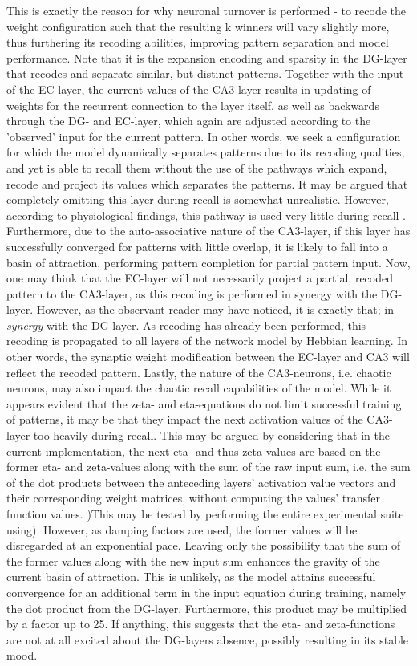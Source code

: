 This is exactly the reason for why neuronal turnover is performed - to recode the weight configuration such that the resulting k winners will vary slightly more, thus furthering its recoding abilities, improving pattern separation and model performance. Note that it is the expansion encoding and sparsity in the DG-layer that recodes and separate similar, but distinct patterns. Together with the input of the EC-layer, the current values of the CA3-layer results in updating of weights for the recurrent connection to the layer itself, as well as backwards through the DG- and EC-layer, which again are adjusted according to the 'observed' input for the current pattern. In other words, we seek a configuration for which the model dynamically separates patterns due to its recoding qualities, and yet is able to recall them without the use of the pathways which expand, recode and project its values which separates the patterns. It may be argued that completely omitting this layer during recall is somewhat unrealistic. However, according to physiological findings, this pathway is used very little during recall \citep{Wakagi2008}. Furthermore, due to the auto-associative nature of the CA3-layer, if this layer has successfully converged for patterns with little overlap, it is likely to fall into a basin of attraction, performing pattern completion for partial pattern input. Now, one may think that the EC-layer will not necessarily project a partial, recoded pattern to the CA3-layer, as this recoding is performed in synergy with the DG-layer. However, as the observant reader may have noticed, it is exactly that; in \textit{synergy} with the DG-layer. As recoding has already been performed, this recoding is propagated to all layers of the network model by Hebbian learning. In other words, the synaptic weight modification between the EC-layer and CA3 will reflect the recoded pattern.
Lastly, the nature of the CA3-neurons, i.e. chaotic neurons, may also impact the chaotic recall capabilities of the model. While it appears evident that the zeta- and eta-equations do not limit successful training of patterns, it may be that they impact the next activation values of the CA3-layer too heavily during recall. This may be argued by considering that in the current implementation, the next eta- and thus zeta-values are based on the former eta- and zeta-values along with the sum of the raw input sum, i.e. the sum of the dot products between the anteceding layers' activation value vectors and their corresponding weight matrices, without computing the values' transfer function values. )This may be tested by performing the entire experimental suite using). However, as damping factors are used, the former values will be disregarded at an exponential pace. Leaving only the possibility that the sum of the former values along with the new input sum enhances the gravity of the current basin of attraction. This is unlikely, as the model attains successful convergence for an additional term in the input equation during training, namely the dot product from the DG-layer. Furthermore, this product may be multiplied by a factor up to 25. If anything, this suggests that the eta- and zeta-functions are not at all excited about the DG-layers absence, possibly resulting in its stable mood.


